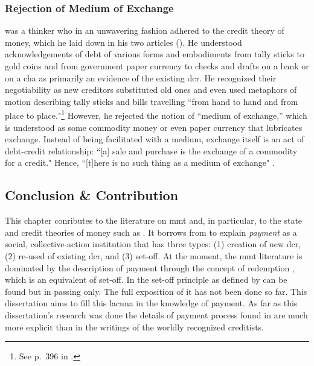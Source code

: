 \subsubsection{Rejection of Medium of Exchange}\label{sec:medium_of_exchange}

\citeauthor{innes1913} was a thinker who in an unwavering fashion adhered to the credit theory of money, which he laid down in his two articles (\citeyear{innes1913,innes1914}). He understood acknowledgements of debt of various forms and embodiments from tally sticks to gold coins and from government paper currency to checks and drafts on a bank or on a \acf{cha} as primarily an evidence of the existing \acf{dcr}. He recognized their negotiability as new creditors substituted old ones and even used metaphors of motion describing tally sticks and bills travelling ``from hand to hand and from place to
place."\footnote{See p.~396 in \cite{innes1913}.} However, he rejected the notion of ``medium of exchange,'' which is understood as some commodity money or even paper currency that lubricates exchange. Instead of being facilitated with a medium, exchange itself is an act of debt-credit relationship: ``[a] sale and purchase is the exchange of a commodity for a credit." Hence, ``[t]here is no such thing as a medium of exchange" \citep[p.~168]{innes1914}.

\subsection{Conclusion \& Contribution}

This chapter conributes to the literature on \ac{mmt} and, in particular, to the state and credit theories of money such as \citep{wray2004,wray2020,tymoigne2017,tymoigne2024}. It borrows from \citep{innes1909,innes1910,innes1913,innes1914} to explain \textit{payment} as a social, collective-action institution that has three types: (1) creation of new \acf{dcr}, (2) re-used of existing \acf{dcr}, and (3) set-off. At the moment, the \ac{mmt} literature is dominated by the description of payment through the concept of redemption \citep{wray2020,tymoigne2017,tymoigne2024}, which is an equivalent of set-off. In \citep[p.~241]{wray2004_} the set-off principle as defined by \citeauthor{innes1913} can be found but in passing only. The full exposition of it has not been done so far. This dissertation aims to fill this lacuna in the knowledge of payment. As far as this dissertation's research was done the details of payment process found in \citeauthor{innes1913} are much more explicit than in the writings of the worldly recognized creditists. 

